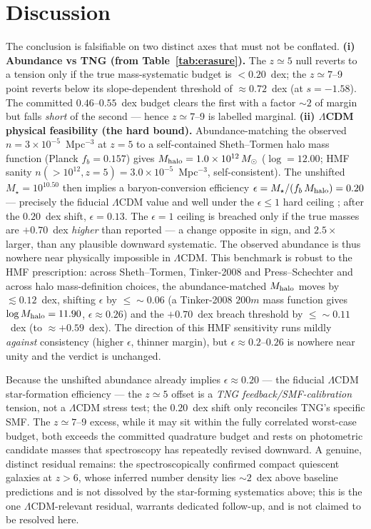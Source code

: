 \documentclass[twocolumn]{aastex631}
\begin{document}
\section{Discussion}
The conclusion is falsifiable on two distinct axes that must not be conflated.
\textbf{(i) Abundance vs TNG (from Table~\ref{tab:erasure}).} The $z\simeq5$ null reverts to a tension
only if the true mass-systematic budget is $<0.20$~dex; the $z\simeq7$--9 point reverts below its
slope-dependent threshold of $\approx0.72$~dex (at $s=-1.58$). The committed $0.46$--$0.55$~dex budget
clears the first with a factor $\sim2$ of margin but falls \emph{short} of the second --- hence
$z\simeq7$--9 is labelled marginal.
\textbf{(ii) $\Lambda$CDM physical feasibility (the hard bound).} Abundance-matching the observed
$n=3\times10^{-5}$~Mpc$^{-3}$ at $z=5$ to a self-contained Sheth--Tormen halo mass function (Planck
$f_b=0.157$) gives $M_{\rm halo}=1.0\times10^{12}\,M_\odot$ ($\log=12.00$; HMF sanity
$n(>10^{12},z{=}5)=3.0\times10^{-5}$~Mpc$^{-3}$, self-consistent). The unshifted $M_\star=10^{10.50}$
then implies a baryon-conversion efficiency $\epsilon=M_\star/(f_b\,M_{\rm halo})=0.20$ --- precisely
the fiducial $\Lambda$CDM value and well under the $\epsilon\le1$ hard ceiling \citep{bk23}; after the
$0.20$~dex shift, $\epsilon=0.13$. The $\epsilon=1$ ceiling is breached only if the true masses are
$+0.70$~dex \emph{higher} than reported --- a change opposite in sign, and $2.5\times$ larger, than any
plausible downward systematic. The observed abundance is thus nowhere near physically impossible in
$\Lambda$CDM. This benchmark is robust to the HMF prescription: across Sheth--Tormen, Tinker-2008 and
Press--Schechter and across halo mass-definition choices, the abundance-matched $M_{\rm halo}$ moves by
$\lesssim0.12$~dex, shifting $\epsilon$ by $\le\sim0.06$ (a Tinker-2008 $200m$ mass function gives
$\log M_{\rm halo}=11.90$, $\epsilon\approx0.26$) and the $+0.70$~dex breach threshold by
$\le\sim0.11$~dex (to $\approx+0.59$~dex). The direction of this HMF sensitivity runs mildly
\emph{against} consistency (higher $\epsilon$, thinner margin), but $\epsilon\approx0.2$--$0.26$ is
nowhere near unity and the verdict is unchanged.

Because the unshifted abundance already implies $\epsilon\approx0.20$ --- the fiducial $\Lambda$CDM
star-formation efficiency --- the $z\simeq5$ offset is a \emph{TNG feedback/SMF-calibration} tension,
not a $\Lambda$CDM stress test; the $0.20$~dex shift only reconciles TNG's specific SMF. The
$z\simeq7$--9 excess, while it may sit within the fully correlated worst-case budget, both exceeds the
committed quadrature budget and rests on photometric candidate masses that spectroscopy has repeatedly
revised downward. A genuine, distinct residual remains: the spectroscopically confirmed compact
quiescent galaxies at $z>6$, whose inferred number density lies $\sim2$~dex above baseline predictions
and is not dissolved by the star-forming systematics above; this is the one $\Lambda$CDM-relevant
residual, warrants dedicated follow-up, and is not claimed to be resolved here.
\end{document}
